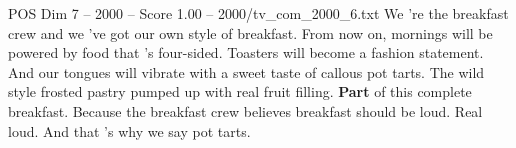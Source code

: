 \begin{textsample}{POS Dim 7 – 2000 – Score 1.00 – 2000/tv\_com\_2000\_6.txt}  \label{ex:f7_pos_057}
We 're the breakfast crew and we 've got our own style of breakfast.
From now on, mornings will be powered by food that 's four-sided.
Toasters will become a fashion statement.
And our tongues will vibrate with a sweet taste of callous pot tarts.
The wild style frosted pastry pumped up with real fruit filling. \textbf{Part} of this complete breakfast.
Because the breakfast crew believes breakfast should be loud.
Real loud.
And that 's why we say pot tarts.

\end{textsample}
